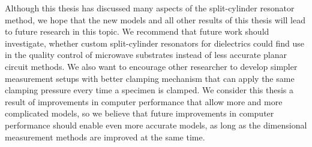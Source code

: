 Although this thesis has discussed many aspects of the split-cylinder resonator method, we hope that the new models and all other results of this thesis will lead to future research in this topic. We recommend that future work should investigate, whether custom split-cylinder resonators for dielectrics could find use in the quality control of microwave substrates instead of less accurate planar circuit methods. We also want to encourage other researcher to develop simpler measurement setups with better clamping mechanism that can apply the same clamping pressure every time a specimen is clamped. We consider this thesis a result of improvements in computer performance that allow more and more complicated models, so we believe that future improvements in computer performance should enable even more accurate models, as long as the dimensional measurement methods are improved at the same time.

